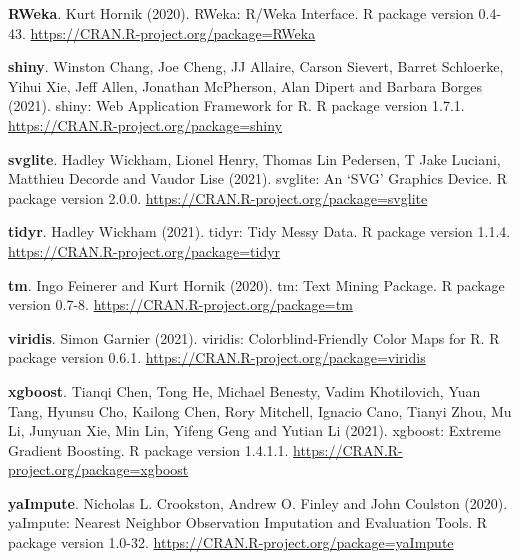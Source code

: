 \documentclass[
  12pt,
]{krantz}
\begin{document}
\textbf{RWeka}. Kurt Hornik (2020). RWeka: R/Weka Interface. R package version 0.4-43. \url{https://CRAN.R-project.org/package=RWeka}

\textbf{shiny}. Winston Chang, Joe Cheng, JJ Allaire, Carson Sievert, Barret Schloerke, Yihui Xie, Jeff Allen, Jonathan McPherson, Alan Dipert and Barbara Borges (2021). shiny: Web Application Framework for R. R package version 1.7.1. \url{https://CRAN.R-project.org/package=shiny}

\textbf{svglite}. Hadley Wickham, Lionel Henry, Thomas Lin Pedersen, T Jake Luciani, Matthieu Decorde and Vaudor Lise (2021). svglite: An `SVG' Graphics Device. R package version 2.0.0. \url{https://CRAN.R-project.org/package=svglite}

\textbf{tidyr}. Hadley Wickham (2021). tidyr: Tidy Messy Data. R package version 1.1.4. \url{https://CRAN.R-project.org/package=tidyr}

\textbf{tm}. Ingo Feinerer and Kurt Hornik (2020). tm: Text Mining Package. R package version 0.7-8. \url{https://CRAN.R-project.org/package=tm}

\textbf{viridis}. Simon Garnier (2021). viridis: Colorblind-Friendly Color Maps for R. R package version 0.6.1. \url{https://CRAN.R-project.org/package=viridis}

\textbf{xgboost}. Tianqi Chen, Tong He, Michael Benesty, Vadim Khotilovich, Yuan Tang, Hyunsu Cho, Kailong Chen, Rory Mitchell, Ignacio Cano, Tianyi Zhou, Mu Li, Junyuan Xie, Min Lin, Yifeng Geng and Yutian Li (2021). xgboost: Extreme Gradient Boosting. R package version 1.4.1.1. \url{https://CRAN.R-project.org/package=xgboost}

\textbf{yaImpute}. Nicholas L. Crookston, Andrew O. Finley and John Coulston (2020). yaImpute: Nearest Neighbor Observation Imputation and Evaluation Tools. R package version 1.0-32. \url{https://CRAN.R-project.org/package=yaImpute}

\printindex
\end{document}
